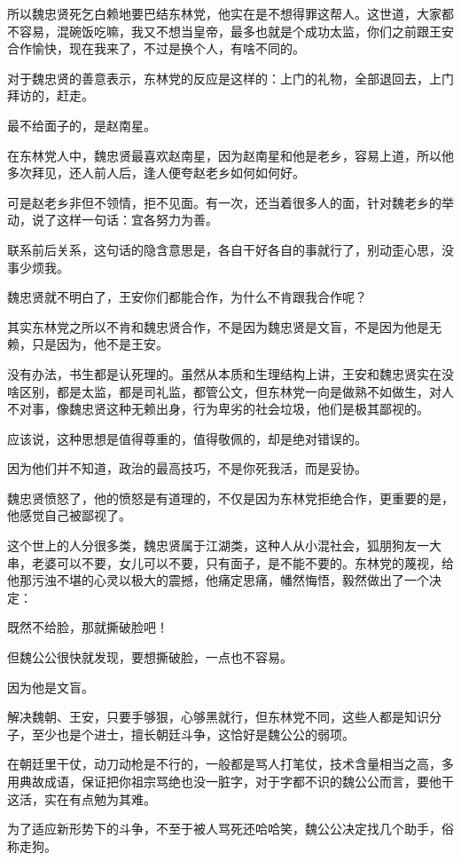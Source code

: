 \begin{multicols}{\theparacolNo}
		所以魏忠贤死乞白赖地要巴结东林党，他实在是不想得罪这帮人。这世道，大家都不容易，混碗饭吃嘛，我又不想当皇帝，最多也就是个成功太监，你们之前跟王安合作愉快，现在我来了，不过是换个人，有啥不同的。

		对于魏忠贤的善意表示，东林党的反应是这样的：上门的礼物，全部退回去，上门拜访的，赶走。

		最不给面子的，是赵南星。

		在东林党人中，魏忠贤最喜欢赵南星，因为赵南星和他是老乡，容易上道，所以他多次拜见，还人前人后，逢人便夸赵老乡如何如何好。

		可是赵老乡非但不领情，拒不见面。有一次，还当着很多人的面，针对魏老乡的举动，说了这样一句话：宜各努力为善。

		联系前后关系，这句话的隐含意思是，各自干好各自的事就行了，别动歪心思，没事少烦我。

		魏忠贤就不明白了，王安你们都能合作，为什么不肯跟我合作呢？

		其实东林党之所以不肯和魏忠贤合作，不是因为魏忠贤是文盲，不是因为他是无赖，只是因为，他不是王安。

		没有办法，书生都是认死理的。虽然从本质和生理结构上讲，王安和魏忠贤实在没啥区别，都是太监，都是司礼监，都管公文，但东林党一向是做熟不如做生，对人不对事，像魏忠贤这种无赖出身，行为卑劣的社会垃圾，他们是极其鄙视的。

		应该说，这种思想是值得尊重的，值得敬佩的，却是绝对错误的。

		因为他们并不知道，政治的最高技巧，不是你死我活，而是妥协。

		魏忠贤愤怒了，他的愤怒是有道理的，不仅是因为东林党拒绝合作，更重要的是，他感觉自己被鄙视了。

		这个世上的人分很多类，魏忠贤属于江湖类，这种人从小混社会，狐朋狗友一大串，老婆可以不要，女儿可以不要，只有面子，是不能不要的。东林党的蔑视，给他那污浊不堪的心灵以极大的震撼，他痛定思痛，幡然悔悟，毅然做出了一个决定：

		既然不给脸，那就撕破脸吧！

		但魏公公很快就发现，要想撕破脸，一点也不容易。

		因为他是文盲。

		解决魏朝、王安，只要手够狠，心够黑就行，但东林党不同，这些人都是知识分子，至少也是个进士，擅长朝廷斗争，这恰好是魏公公的弱项。

		在朝廷里干仗，动刀动枪是不行的，一般都是骂人打笔仗，技术含量相当之高，多用典故成语，保证把你祖宗骂绝也没一脏字，对于字都不识的魏公公而言，要他干这活，实在有点勉为其难。

		为了适应新形势下的斗争，不至于被人骂死还哈哈笑，魏公公决定找几个助手，俗称走狗。


\end{multicols}
